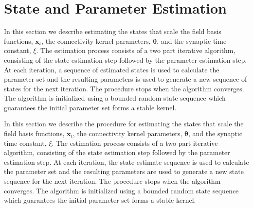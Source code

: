 \documentclass[twocolumn,11pt,a4paper]{article}		%
\begin{document}
% 
\section{State and Parameter Estimation}\label{StateAndParameterEstimationSection} In this section we describe  estimating the states that scale the field basis functions, $\mathbf{x}_t$, the connectivity kernel parameters, $\boldsymbol \theta$, and the synaptic time constant, $\xi$. The estimation process consists of a two part iterative algorithm, consisting of the state estimation step followed by the parameter estimation step. At each iteration, a sequence of estimated states is used to calculate the parameter set and the resulting parameters is used to generate a new sequence of states for the next iteration. The procedure stops when the algorithm converges. The algorithm is initialized using a bounded random state sequence which guarantees the initial parameter set forms a stable kernel.
\label{StateAndParameterEstimationSection} 

In this section we describe the procedure for estimating the states that scale the field basis functions, $\mathbf{x}_t$, the connectivity kernel parameters, $\boldsymbol \theta$, and the synaptic time constant, $\xi$. The estimation process consists of a two part iterative algorithm, consisting of the state estimation step followed by the parameter estimation step. At each iteration, the state estimate sequence is used to calculate the parameter set and the resulting parameters are used to generate a new state sequence for the next iteration. The procedure stops when the algorithm converges. The algorithm is initialized using a bounded random state sequence which guarantees the initial parameter set forms a stable kernel.
\end{document}
